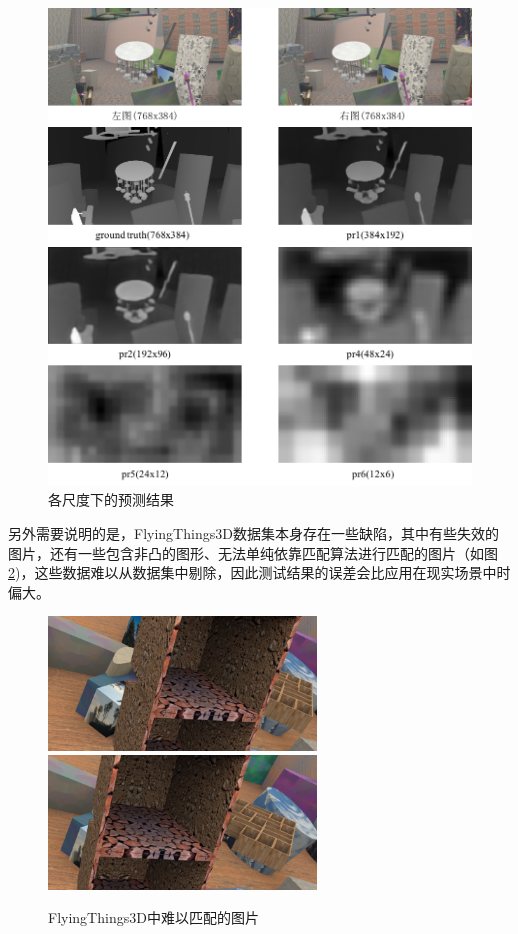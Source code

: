 \begin{figure}[htbp] %
	\centering\includegraphics[width=6in]{figures/4_3_ft3d_multiscale}
	\caption{各尺度下的预测结果} \label{fig:4_3_ft3d_multiscale}
\end{figure}

另外需要说明的是，FlyingThings3D数据集本身存在一些缺陷，其中有些失效的图片，还有一些包含非凸的图形、无法单纯依靠匹配算法进行匹配的图片（如图\ref{fig:4_3_abnormal})，这些数据难以从数据集中剔除，因此测试结果的误差会比应用在现实场景中时偏大。
\begin{figure}[htbp]
	\centering\includegraphics[width=2.8in]{figures/4_3_abnormal_imgs/l_003}
	\hspace{20pt}
	\centering\includegraphics[width=2.8in]{figures/4_3_abnormal_imgs/r_003}
	\caption{FlyingThings3D中难以匹配的图片}\label{fig:4_3_abnormal}
\end{figure}

